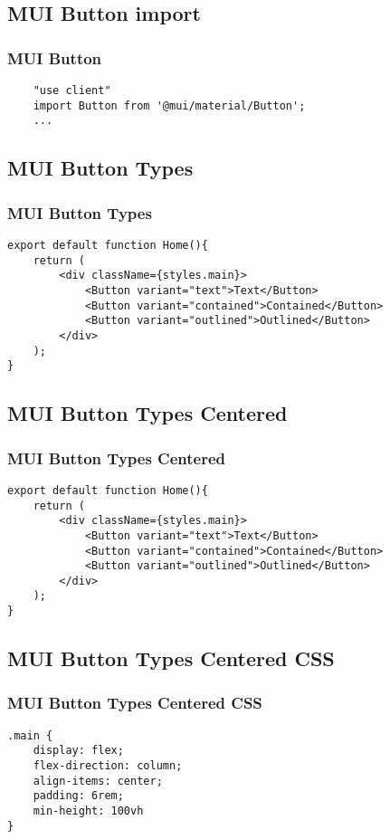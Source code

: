 \documentclass{beamer}
\begin{document}
\subsection{MUI Button import}
\begin{frame}[fragile]
\frametitle{MUI Button}
\begin{lstlisting}
    "use client"
    import Button from '@mui/material/Button';
    ...
\end{lstlisting}
\end{frame}

\subsection{MUI Button Types}
\begin{frame}[fragile]
\frametitle{MUI Button Types}
\begin{lstlisting}
export default function Home(){
    return (
        <div className={styles.main}>
            <Button variant="text">Text</Button>
            <Button variant="contained">Contained</Button>
            <Button variant="outlined">Outlined</Button>
        </div>
    );
}
\end{lstlisting}
\end{frame}

\subsection{MUI Button Types Centered}
\begin{frame}[fragile]
\frametitle{MUI Button Types Centered}
\begin{lstlisting}
export default function Home(){
    return (
        <div className={styles.main}>
            <Button variant="text">Text</Button>
            <Button variant="contained">Contained</Button>
            <Button variant="outlined">Outlined</Button>
        </div>
    );
}
\end{lstlisting}
\end{frame}

\subsection{MUI Button Types Centered CSS}
\begin{frame}[fragile]
\frametitle{MUI Button Types Centered CSS}
\begin{lstlisting}
.main {
    display: flex;
    flex-direction: column;
    align-items: center;
    padding: 6rem;
    min-height: 100vh
}
\end{lstlisting}
\end{frame}
\end{document}
